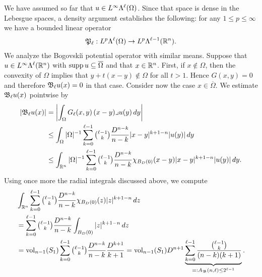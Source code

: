 \documentclass[10pt,letterpaper]{article}
\begin{document}
We have assumed so far that $u \in L^{\infty}\Lambda^{\ell}(\Omega)$. 
Since that space is dense in the Lebesgue spaces, a density argument establishes the following: 
for any $1 \leq p \leq \infty$ we have a bounded linear operator 
\begin{gather*}
    {\mathfrak P}_{\ell} : L^{p}\Lambda^{\ell}(\Omega) \rightarrow L^{p}\Lambda^{\ell-1}({\mathbb R}^n).
\end{gather*}
% 
We analyze the Bogovski\u{\i} potential operator with similar means. 
Suppose that $u \in L^{\infty}\Lambda^{\ell}({\mathbb R}^{n})$ with $\operatorname{supp} u \subseteq \overline\Omega$ and that $x \in {\mathbb R}^{n}$.
First, if $x \notin \Omega$, then the convexity of $\Omega$ implies that $y + t( x - y ) \notin \Omega$ for all $t > 1$. Hence $G(x,y) = 0$ and therefore ${\mathfrak B}_{\ell} u(x) = 0$ in that case.
Consider now the case $x \in \overline\Omega$. 
We estimate ${\mathfrak B}_{\ell} u(x)$ pointwise by 
\begin{align*}
    \left| {\mathfrak B}_{\ell} u(x) \right|
    &=
    \left| 
        \int_{\Omega} G_{\ell}(x,y) \,(x-y)\lrcorner u(y)\,dy
    \right| 
    \\&\leq 
    \int_{\Omega} |\Omega|^{-1} \sum_{k=0}^{\ell-1}\tbinom{\ell-1}{k} \frac{ D^{n-k} }{n-k} |x-y|^{k+1-n} |u(y)| \,dy
    \\&\leq 
    \int_{{\mathbb R}^{n}} |\Omega|^{-1} \sum_{k=0}^{\ell-1}\tbinom{\ell-1}{k} \frac{ D^{n-k} }{n-k} \chi_{B_D(0)}(x-y) |x-y|^{k+1-n} |u(y)| \,dy
    .
\end{align*}
Using once more the radial integrals discussed above, we compute 
\begin{align*}
    &
    \int_{{\mathbb R}^{n}} \sum_{k=0}^{\ell-1} \tbinom{\ell-1}{k} \frac{ D^{n-k} }{n-k} \chi_{B_D(0)}(z) |z|^{k+1-n} \,dz
    \\&
    =
    \sum_{k=0}^{\ell-1} \tbinom{\ell-1}{k} \frac{ D^{n-k} }{n-k} \int_{B_D(0)} |z|^{k+1-n} \,dz
    \\&
    =
    \operatorname{vol}_{n-1}(S_1) \sum_{k=0}^{\ell-1} \tbinom{\ell-1}{k} \frac{ D^{n-k} }{n-k} \frac{D^{k+1}}{k+1}
    =
    \operatorname{vol}_{n-1}(S_1) D^{n+1} \underbrace{ \sum_{k=0}^{\ell-1} \frac{ \tbinom{\ell-1}{k} }{ (n-k)(k+1) } }_{ =: A_{{\mathfrak B}}(n,\ell) \leq 2^{\ell-1}}
    .
\end{align*}
\end{document}
